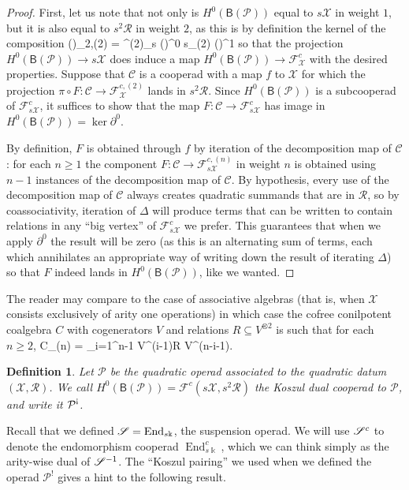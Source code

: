 \documentclass[fleqn, a4paper, twoside]{article}
\makeatletter
\newcommand{\antishriek}{\text{\raisebox{\depth}{\textexclamdown}}}
\newcommand{\0}{\langle 0\rangle}
\newcommand{\XX}{\mathcal{X}}
\newcommand{\End}{\operatorname{End}}
\newcommand{\RR}{\mathcal{R}}
\newcommand{\FF}{\mathcal{F}}
\newcommand{\B}[1]{\mathsf{B}(#1)}
\let\[\@undefined
\DeclareRobustCommand{\[}{\begin{equation}}%
\let\]\@undefined
\DeclareRobustCommand{\]}{\end{equation}}%
\theoremstyle{mytheorem}
\theoremstyle{introthm}
\theoremstyle{mydefinition}
\newtheorem{definition}[theorem]{Definition}
\theoremstyle{mydefinition2}
\theoremstyle{plain} %
\newcommand{\CC}{\mathcal{C}}
\newcommand{\?}{\,?\,}
\newcommand{\kk}{\Bbbk}
\newcommand{\PP}{{\mathcal{P}}}
\theoremstyle{mytheorem}
\theoremstyle{plain} %
\makeatother
\begin{document}
\begin{proof}
First, let us note that not only is $H^0(\B{\PP})$ equal to $s\XX$ in
weight $1$, but it is also equal to $s^2\RR$ in weight $2$, as this is
by definition the kernel of the composition
\[
 \B{\PP}_{2,(2)} = \FF^{(2)}_{s\XX} \subseteq \B{\PP}^0
 	\longrightarrow 
 	s\overline{\PP}_{(2)}  \subseteq   \B{\PP}^1 
\]
so that the projection $H^0(\B{\PP})\longrightarrow s\XX$ does induce a map
$H^0(\B{\PP}) \longrightarrow \FF^c_\XX$ with the desired properties. 
Suppose that $\CC$ is a cooperad with a map $f$ to $\XX$ for which
the projection $\pi\circ F: \CC \longrightarrow \FF_\XX^{c,(2)}$ lands
in $s^2\RR$. Since $H^0(\B{\PP})$ is a subcooperad of $\FF^c_{s\XX}$,
it suffices to show that the map $F: \CC\longrightarrow \FF^c_{s\XX}$
has image in $H^0(\B{\PP}) = \ker \partial^0$.

By definition, $F$ is obtained through $f$ by iteration of the decomposition
map of $\CC$: for each $n\geqslant 1$ the component $F: \CC\longrightarrow 
\FF^{c,(n)}_{s\XX}$ in weight $n$ is obtained using $n-1$ instances of the
decomposition map of $\CC$. By hypothesis, every use of the decomposition
map of $\CC$ always creates quadratic summands that are in $\RR$, so by
coassociativity, iteration of $\Delta$ will produce terms that can be written
to contain relations in any ``big vertex'' of $\FF_{s\XX}^c$ we prefer.
This guarantees that when we apply $\partial^0$ the result will be
zero (as this is an alternating sum of terms, each which annihilates 
an appropriate way of writing down the result of iterating $\Delta$)
so that $F$ indeed lands in $H^0(\B{\PP})$, like we wanted.
\end{proof}

The reader may compare to the case of associative algebras (that is,
when $\XX$ consists exclusively of arity one operations) in which case
the cofree conilpotent coalgebra $C$ with cogenerators $V$ and relations
$R\subseteq V^{\otimes 2}$ is such that for each $n\geqslant 2$,
\[
C_{(n)} = \bigcap_{i=1}^{n-1} V^{\otimes (i-1)}\otimes R\otimes 
					V^{\otimes(n-i-1)}.
\]

\begin{definition}
Let $\PP$ be the quadratic operad associated to the quadratic datum 
$(\XX,\RR)$. We call $H^0(\B{\PP})= \FF^c(s\XX,s^2\RR)$ the Koszul dual cooperad
to $\PP$, and write it $\PP^\antishriek$.
\end{definition}

Recall that we defined $\sus = \End_{s\kk}$, the suspension operad.
We will use $\mathscr{S}^c$ to denote the endomorphism cooperad $\End_{s\kk}^c$,
which we can think simply as the arity-wise dual of $\mathscr{S}^{-1}$.
The ``Koszul pairing'' we used when we defined the operad $\PP^!$
gives a hint to the following result.
\end{document}
